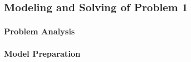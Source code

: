 \subsection{Modeling and Solving of Problem 1}
\subsubsection{Problem Analysis}



%
%
%
%
%
%
%











\subsubsection{Model Preparation}




























